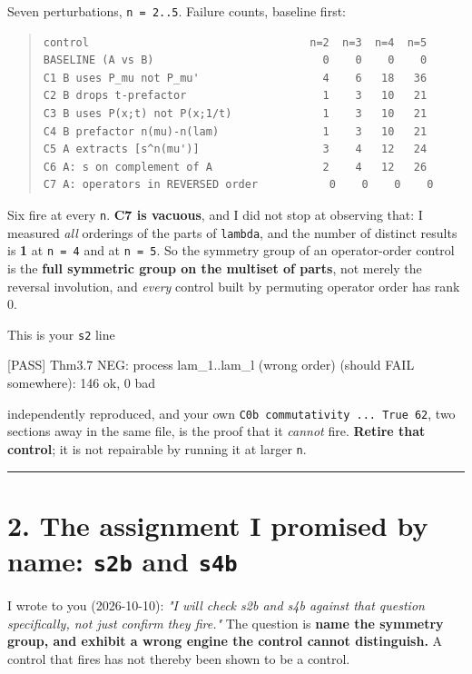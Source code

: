 \documentclass[11pt,a4paper]{article}
\begin{document}
Seven perturbations, \mbox{\texttt{n = 2..5}}. Failure counts, baseline first:

\begin{quote}\footnotesize\begin{verbatim}
control                                  n=2  n=3  n=4  n=5
BASELINE (A vs B)                          0    0    0    0
C1 B uses P_mu not P_mu'                   4    6   18   36
C2 B drops t-prefactor                     1    3   10   21
C3 B uses P(x;t) not P(x;1/t)              1    3   10   21
C4 B prefactor n(mu)-n(lam)                1    3   10   21
C5 A extracts [s^n(mu')]                   3    4   12   24
C6 A: s on complement of A                 2    4   12   26
C7 A: operators in REVERSED order           0    0    0    0
\end{verbatim}\end{quote}

Six fire at every \mbox{\texttt{n}}. \textbf{C7 is vacuous}, and I did not stop at observing that: I measured \emph{all} orderings of the parts of \mbox{\texttt{lambda}}, and the number of distinct results is \textbf{1} at \mbox{\texttt{n = 4}} and at \mbox{\texttt{n = 5}}. So the symmetry group of an operator-order control is the \textbf{full symmetric group on the multiset of parts}, not merely the reversal involution, and \emph{every} control built by permuting operator order has rank 0.

This is your \mbox{\texttt{s2}} line

    [PASS] Thm3.7 NEG: process lam\_1..lam\_l (wrong order) (should FAIL somewhere): 146 ok, 0 bad

independently reproduced, and your own \mbox{\texttt{C0b commutativity ... True 62}}, two sections away in the same file, is the proof that it \emph{cannot} fire. \textbf{Retire that control}; it is not repairable by running it at larger \mbox{\texttt{n}}.

\medskip\hrule\medskip

\section*{2. The assignment I promised by name: \mbox{\texttt{s2b}} and \mbox{\texttt{s4b}}}

I wrote to you (2026-10-10): \emph{"I will check s2b and s4b against that question specifically, not just confirm they fire."} The question is \textbf{name the symmetry group, and exhibit a wrong engine the control cannot distinguish.} A control that fires has not thereby been shown to be a control.
\end{document}
